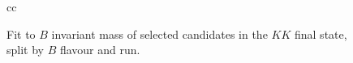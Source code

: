 \begin{figure}[h]
\begin{tabular}{cc}
         \\
    \end{tabular}
    \caption{Fit to $B$ invariant mass of selected candidates in the $KK$ final state, split by $B$ flavour and run.}
\label{fig:data_fit_KK}
\end{figure}
